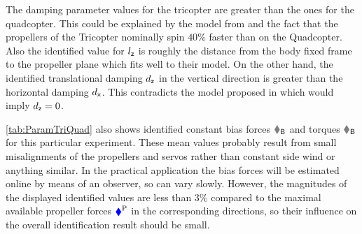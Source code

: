 The damping parameter values for the tricopter are greater than the ones for the quadcopter.
This could be explained by the model from \cite{Martin:AccelerometerFeedback} and the fact that the propellers of the Tricopter nominally spin $40\%$ faster than on the Quadcopter.
Also the identified value for $l_{\mathsf{z}}$ is roughly the distance from the body fixed frame to the propeller plane which fits well to their model.
On the other hand, the identified translational damping $d_{\mathsf{z}}$ in the vertical direction is greater than the horizontal damping $d_{\mathsf{x}}$.
This contradicts the model proposed in \cite{Martin:AccelerometerFeedback} which would imply $d_{\mathsf{z}} = 0$.

\autoref{tab:ParamTriQuad} also shows identified constant bias forces $\FB$ and torques $\tauB$ for this particular experiment.
These mean values probably result from small misalignments of the propellers and servos rather than constant side wind or anything similar.
In the practical application the bias forces will be estimated online by means of an observer, so can vary slowly.
However, the magnitudes of the displayed identified values are less than $3\%$ compared to the maximal available propeller forces $\boldsymbol{\textcolor{blue}{\blacklozenge}}^{\mathrm{P}}$ in the corresponding directions, so their influence on the overall identification result should be small.



% 



